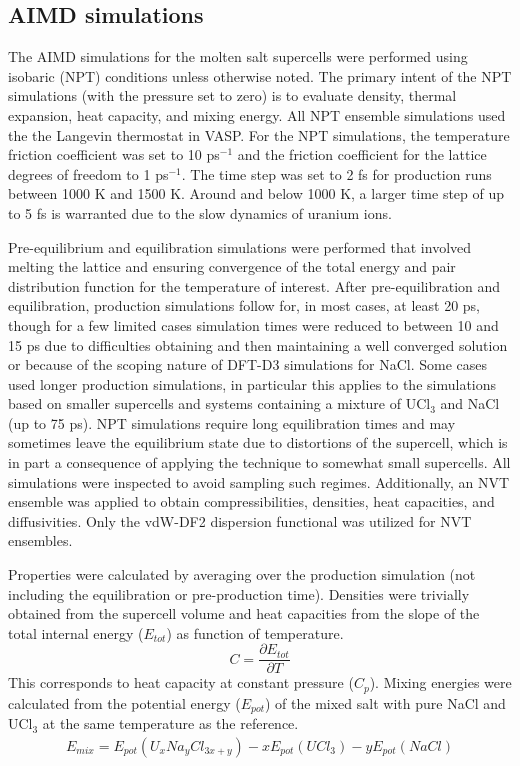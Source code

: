 \documentclass[preprint,3p,10pt,onecolumn,number,sort&compress]{elsarticle}
\begin{document}
{%

\subsection{AIMD simulations}
The AIMD simulations for the molten salt supercells were performed using isobaric (NPT) conditions unless otherwise noted. The primary intent of the NPT simulations (with the pressure set to zero) is to evaluate density, thermal expansion, heat capacity, and mixing energy. All NPT ensemble simulations used the the Langevin thermostat in VASP. For the NPT simulations, the temperature friction coefficient was set to 10 ps$^{-1}$ and the friction coefficient for the lattice degrees of freedom to 1 ps$^{-1}$. The time step was set to 2 fs for production runs between 1000 K and 1500 K. Around and below 1000 K, a larger time step of up to 5 fs is warranted due to the slow dynamics of uranium ions.

Pre-equilibrium and equilibration simulations were performed that involved melting the lattice and ensuring convergence of the total energy and pair distribution function for the temperature of interest. After pre-equilibration and equilibration, production simulations follow for, in most cases, at least 20 ps, though for a few limited cases simulation times were reduced to between 10 and 15 ps due to difficulties obtaining and then maintaining a well converged solution or because of the scoping nature of DFT-D3 simulations for NaCl. Some cases used longer production simulations, in particular this applies to the simulations based on smaller supercells and systems containing a mixture of UCl$_3$ and NaCl (up to 75 ps). NPT simulations require long equilibration times and may sometimes leave the equilibrium state due to distortions of the supercell, which is in part a consequence of applying the technique to somewhat small supercells. All simulations were inspected to avoid sampling such regimes. Additionally, an NVT ensemble was applied to obtain compressibilities, densities, heat capacities, and diffusivities. Only the vdW-DF2 dispersion functional was utilized for NVT ensembles. 

Properties were calculated by averaging over the production simulation (not including the equilibration or pre-production time). Densities were trivially obtained from the supercell volume and heat capacities from the slope of the total internal energy ($E_{tot}$) as function of temperature. 
\begin{equation}
\label{eq:cp}
C=\frac{\partial E_{tot}}{\partial T}
\end{equation}
This corresponds to heat capacity at constant pressure ($C_p$). Mixing energies were calculated from the potential energy ($E_{pot}$) of the mixed salt with pure NaCl and UCl$_3$ at the same temperature as the reference. 
\begin{equation}
\begin{split}
E_{mix}=E_{pot}(U_xNa_yCl_{3x+y})-xE_{pot}(UCl_3)-yE_{pot}(NaCl)
\end{split}
\end{equation}

}
\end{document}
